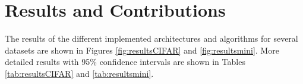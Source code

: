 \section{Results and Contributions}
\label{res}

The results of the different implemented architectures and algorithms for several datasets are shown in Figures \ref{fig:resultsCIFAR} and \ref{fig:resultsmini}. More detailed results with 95\% confidence intervals are shown in Tables \ref{tab:resultsCIFAR} and \ref{tab:resultsmini}.

